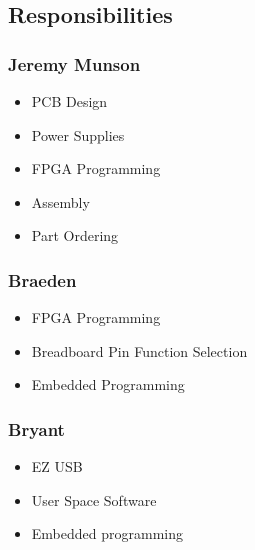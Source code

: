 \subsection{Responsibilities}
	\subsubsection{Jeremy Munson}
		\begin{itemize}
			\item PCB Design
			\item Power Supplies
			\item FPGA Programming
			\item Assembly
			\item Part Ordering
		\end{itemize}

	\subsubsection{Braeden}
		\begin{itemize}
			\item FPGA Programming
			\item Breadboard Pin Function Selection
			\item Embedded Programming
		\end{itemize}
		
	\subsubsection{Bryant}
		\begin{itemize}
			\item EZ USB
			\item User Space Software
			\item Embedded programming
		\end{itemize}